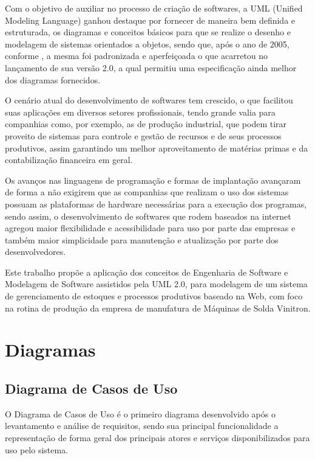 \documentclass[rascunho,xindy,acronym,symbols]{fei}
\begin{document}
Com o objetivo de auxiliar no processo de criação de softwares, a UML (Unified Modeling Language) ganhou destaque por fornecer de maneira bem definida e estruturada, os diagramas e conceitos básicos para que se realize o desenho e modelagem de sistemas orientados a objetos, sendo que, após o ano de 2005, conforme \cite{livroUML2}, a mesma foi padronizada e aperfeiçoada o que acarretou no lançamento de sua versão 2.0, a qual permitiu uma especificação ainda melhor dos diagramas fornecidos.

O cenário atual do desenvolvimento de softwares tem crescido, o que facilitou suas aplicações em diversos setores profissionais, tendo grande valia para companhias como, por exemplo, as de produção industrial, que podem tirar proveito de sistemas para controle e gestão de recursos e de seus processos produtivos, assim garantindo um melhor aproveitamento de matérias primas e da contabilização financeira em geral.

Os avanços nas linguagens de programação e formas de implantação avançaram de forma a não exigirem que as companhias que realizam o uso dos sistemas possuam as plataformas de hardware necessárias para a execução dos programas, sendo assim, o desenvolvimento de softwares que rodem baseados na internet agregou maior flexibilidade e acessibilidade para uso por parte das empresas e também maior simplicidade para manutenção e atualização por parte dos desenvolvedores.

Este trabalho propõe a aplicação dos conceitos de Engenharia de Software e Modelagem de Software assistidos pela UML 2.0, para modelagem de um sistema de gerenciamento de estoques e processos produtivos baseado na Web, com foco na rotina de produção da empresa de manufatura de Máquinas de Solda Vinitron. 

\chapter{Diagramas}

\section{Diagrama de Casos de Uso} \label{diagramaCasoUso}

O Diagrama de Casos de Uso é o primeiro diagrama desenvolvido após o levantamento e análise de requisitos, sendo sua principal funcionalidade a representação de forma geral dos principais atores e serviços disponibilizados para uso pelo sistema.
\end{document}
